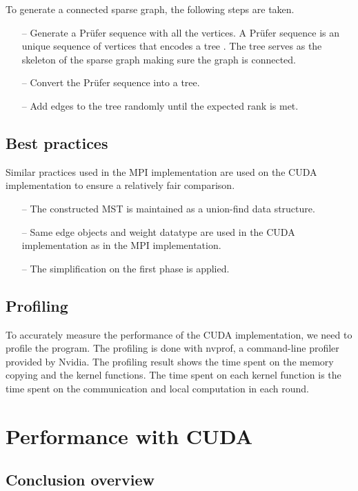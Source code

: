 \documentclass[english, 12pt, a4paper, elec, utf8, a-2b, online]{aaltothesis}
\begin{document}
To generate a connected sparse graph, the following steps are taken.
\begin{itemize}
	\item[--] Generate a Prüfer sequence with all the vertices. A Prüfer sequence is an unique sequence of vertices that encodes a tree \cite{Prufer1918}. The tree serves as the skeleton of the sparse graph making sure the graph is connected.
	\item[--] Convert the Prüfer sequence into a tree.
	\item[--] Add edges to the tree randomly until the expected rank is met.
\end{itemize}

\subsection{Best practices}
Similar practices used in the MPI implementation are used on the CUDA implementation to ensure a relatively fair comparison.
\begin{itemize}
	\item[--] The constructed MST is maintained as a union-find data structure.
	\item[--] Same edge objects and weight datatype are used in the CUDA implementation as in the MPI implementation.
	\item[--] The simplification on the first phase is applied.
\end{itemize}

\subsection{Profiling}
To accurately measure the performance of the CUDA implementation, we need to profile the program. The profiling is done with nvprof, a command-line profiler provided by Nvidia. The profiling result shows the time spent on the memory copying and the kernel functions. The time spent on each kernel function is the time spent on the communication and local computation in each round.

\clearpage

\section{Performance with CUDA}
\label{sec:cuda_performance}
\subsection{Conclusion overview}
\end{document}
